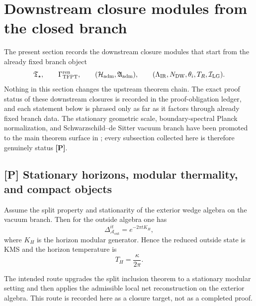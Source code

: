 
\section{Downstream closure modules from the closed branch}
\label{sec:downstream_closure_modules}

The present section records the downstream closure modules that start from the already fixed branch
object
\[
\mathfrak T_{\star},
\qquad
\Gamma_{\mathrm{TFPT}}^{\mathrm{ren}},
\qquad
(\mathcal H_{\mathrm{adm}},\mathfrak A_{\mathrm{adm}}),
\qquad
(\Lambda_{\mathrm{IR}},N_{\mathrm{DW}},\theta_i,T_R,\mathcal I_{\mathrm{LG}}).
\]
Nothing in this section changes the upstream theorem chain. The exact proof status of these
downstream closures is recorded in the proof-obligation ledger, and each statement below is phrased
only as far as it factors through already fixed branch data. The stationary geometric scale,
boundary-spectral Planck normalization, and Schwarzschild--de Sitter vacuum branch have been
promoted to the main theorem surface in ; every
subsection collected here is therefore genuinely status \textbf{[P]}.

\subsection{[P] Stationary horizons, modular thermality, and compact objects}

\begin{conjecture}
\label{thm:modular_horizon_thermality}
Assume the split property and stationarity of the exterior wedge algebra on the vacuum branch. Then
for the outside algebra one has
\[
\Delta_{\mathcal A_{\mathrm{out}}}^{it}=e^{-2\pi t K_H},
\]
where \(K_H\) is the horizon modular generator. Hence the reduced outside state is KMS and the
horizon temperature is
\[
T_H=\frac{\kappa}{2\pi}.
\]
\end{conjecture}

\begin{remark}
The intended route upgrades the split inclusion theorem  to a
stationary modular setting and then applies the admissible local net reconstruction on the exterior
algebra. This route is recorded here as a closure target, not as a completed proof.
\end{remark}

